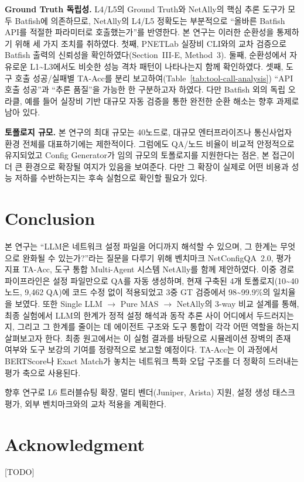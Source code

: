 \documentclass[journal]{IEEEtran}
\begin{document}
\textbf{Ground Truth 독립성.} L4/L5의 Ground Truth와 NetAlly의 핵심 추론 도구가 모두 Batfish에 의존하므로, NetAlly의 L4/L5 정확도는 부분적으로 ``올바른 Batfish API를 적절한 파라미터로 호출했는가''를 반영한다. 본 연구는 이러한 순환성을 통제하기 위해 세 가지 조치를 취하였다. 첫째, PNETLab 실장비 CLI와의 교차 검증으로 Batfish 출력의 신뢰성을 확인하였다(Section~III-E, Method~3). 둘째, 순환성에서 자유로운 L1\textasciitilde L3에서도 비슷한 성능 격차 패턴이 나타나는지 함께 확인하였다. 셋째, 도구 호출 성공/실패별 TA-Acc를 분리 보고하여(Table~\ref{tab:tool-call-analysis}) ``API 호출 성공''과 ``추론 품질''을 가능한 한 구분하고자 하였다. 다만 Batfish 외의 독립 오라클, 예를 들어 실장비 기반 대규모 자동 검증을 통한 완전한 순환 해소는 향후 과제로 남아 있다.

\textbf{토폴로지 규모.} 본 연구의 최대 규모는 40노드로, 대규모 엔터프라이즈나 통신사업자 환경 전체를 대표하기에는 제한적이다. 그럼에도 QA/노드 비율이 비교적 안정적으로 유지되었고 Config Generator가 임의 규모의 토폴로지를 지원한다는 점은, 본 접근이 더 큰 환경으로 확장될 여지가 있음을 보여준다. 다만 그 확장이 실제로 어떤 비용과 성능 저하를 수반하는지는 후속 실험으로 확인할 필요가 있다.

\section{Conclusion}
본 연구는 ``LLM은 네트워크 설정 파일을 어디까지 해석할 수 있으며, 그 한계는 무엇으로 완화될 수 있는가?''라는 질문을 다루기 위해 벤치마크 NetConfigQA~2.0, 평가 지표 TA-Acc, 도구 통합 Multi-Agent 시스템 NetAlly를 함께 제안하였다. 이중 경로 파이프라인은 설정 파일만으로 QA를 자동 생성하며, 현재 구축된 4개 토폴로지(10\textasciitilde40 노드, 9,462 QA)에 코드 수정 없이 적용되었고 3중 GT 검증에서 98\textasciitilde99.9\%의 일치율을 보였다. 또한 Single LLM $\rightarrow$ Pure MAS $\rightarrow$ NetAlly의 3-way 비교 설계를 통해, 최종 실험에서 LLM의 한계가 정적 설정 해석과 동작 추론 사이 어디에서 두드러지는지, 그리고 그 한계를 줄이는 데 에이전트 구조와 도구 통합이 각각 어떤 역할을 하는지 살펴보고자 한다. 최종 원고에서는 이 실험 결과를 바탕으로 시뮬레이션 장벽의 존재 여부와 도구 보강의 기여를 정량적으로 보고할 예정이다. TA-Acc는 이 과정에서 BERTScore나 Exact Match가 놓치는 네트워크 특화 오답 구조를 더 정확히 드러내는 평가 축으로 사용된다.

향후 연구로 L6 트러블슈팅 확장, 멀티 벤더(Juniper, Arista) 지원, 설정 생성 태스크 평가, 외부 벤치마크와의 교차 적용을 계획한다.

\section*{Acknowledgment}
 [TODO]
\end{document}
